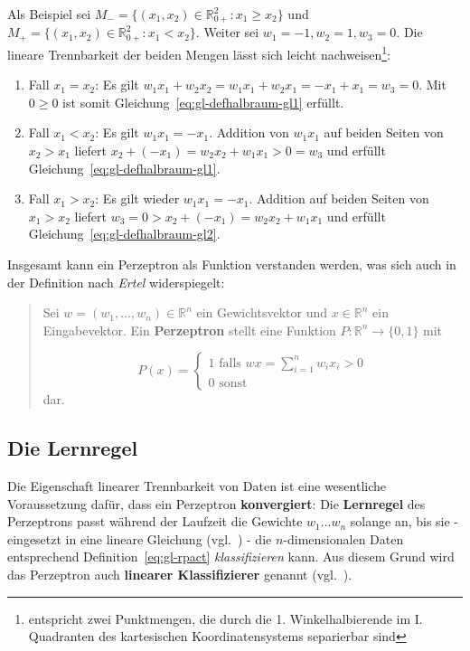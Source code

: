 \noindent
Als Beispiel sei $M_- = \{(x_1, x_2) \in  \mathbb{R}_{0+}^2: x_1 \geq x_2\}$ und $M_+=\{(x_1, x_2) \in  \mathbb{R}_{0+}^2: x_1 < x_2\}$.
Weiter sei $w_1 = -1, w_2 = 1, w_3 = 0$.
Die lineare Trennbarkeit der beiden Mengen lässt sich leicht nachweisen\footnote{entspricht zwei Punktmengen, die durch die 1. Winkelhalbierende im I. Quadranten des kartesischen Koordinatensystems separierbar sind}:

\begin{enumerate}
    \item Fall $x_1 = x_2$: Es gilt $w_1x_1 + w_2x_2 = w_1x_1 + w_2x_1 = -x_1 + x_1 = w_3 = 0$. Mit $0 \geq 0$ ist somit Gleichung~\ref{eq:gl-defhalbraum-gl1} erfüllt.
    \item Fall $x_1 < x_2$: Es gilt $w_1x_1 = -x_1$. Addition von $w_1x_1$ auf beiden Seiten von $x_2 > x_1$ liefert $x_2 + (-x_1) = w_2x_2 + w_1x_1 > 0 = w_3$ und erfüllt Gleichung~\ref{eq:gl-defhalbraum-gl1}.
    \item Fall $x_1 > x_2$: Es gilt wieder $w_1x_1 = -x_1$. Addition auf beiden Seiten von $x_1 > x_2$ liefert $w_3 = 0 > x_2 + (-x_1) = w_2x_2 + w_1x_1$ und erfüllt Gleichung~\ref{eq:gl-defhalbraum-gl2}.
\end{enumerate}


\noindent
Insgesamt kann ein Perzeptron als Funktion verstanden werden, was sich auch in der Definition nach \textit{Ertel} widerspiegelt:

\blockquote[{\cite[212, ``Definition 8.3``; Hervorhebung i.O.]{Ert21a}}]{
    \noindent
    Sei $w = (w_1, ..., w_n) \in  \mathbb{R}^n$ ein Gewichtsvektor und $x \in  \mathbb{R}^n$ ein Eingabevektor. Ein \textbf{Perzeptron} stellt eine Funktion $P:  \mathbb{R}^n \to \{0, 1\}$ mit

    \begin{equation}
        \nonumber
        P(x) = \begin{cases}
                   1 \text{ falls } wx = \sum^n_{i=1} w_ix_i >0 \\
                   0 \text{ sonst }
        \end{cases}
    \end{equation}
    \noindent
    dar.
}


\subsection{Die Lernregel}\label{sec:lernregel}

Die Eigenschaft linearer Trennbarkeit von Daten ist eine wesentliche Voraussetzung dafür, dass ein Perzeptron \textbf{konvergiert}: Die \textbf{Lernregel} des Perzeptrons passt während der Laufzeit die Gewichte $w_1 ... w_n$ solange an, bis sie - eingesetzt in eine lineare Gleichung (vgl.~\cite[311]{Ert21b}) - die $n$-dimensionalen Daten entsprechend Definition~\ref{eq:gl-rpact} \textit{klassifizieren} kann.
Aus diesem Grund wird das Perzeptron auch \textbf{linearer Klassifizierer} genannt (vgl.~\cite[210-216]{Ert21a}).

